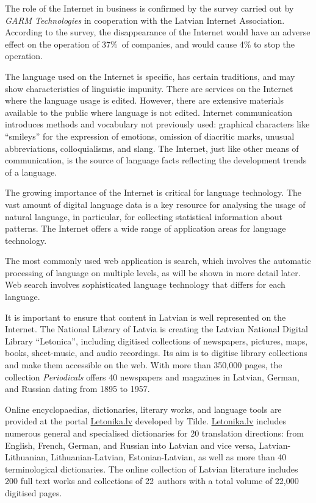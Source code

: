 \begin{multicols}{2}
The role of the Internet in business is confirmed by the survey carried out by \textit{GARM Technologies} in cooperation with the Latvian Internet Association.
According to the survey, the disappearance of the Internet would have an adverse effect on the operation of 37\%~of companies, and would cause 4\% to stop the operation.

The language used on the Internet is specific, has certain traditions, and may show characteristics of linguistic impunity.
There are services on the Internet where the language usage is edited.
However, there are extensive materials available to the public where language is not edited.
Internet communication introduces methods and vocabulary not previously used: graphical characters like ``smileys'' for the expression of emotions, omission of diacritic marks, unusual abbreviations, colloquialisms, and slang.
The Internet, just like other means of communication, is the source of language facts reflecting the development trends of a language.

The growing importance of the Internet is critical for language technology.
The vast amount of digital language data is a key resource for analysing the usage of natural language, in particular, for collecting statistical information about patterns.
The Internet offers a wide range of application areas for language technology.

The most commonly used web application is search, which involves the automatic processing of language on multiple levels, as will be shown in more detail later.
Web search involves sophisticated language technology that differs for each language.

It is important to ensure that content in Latvian is well represented on the Internet.
The National Library of Latvia is creating the Latvian National Digital Library ``Letonica'', including digitised collections of newspapers, pictures, maps, books, sheet-music, and audio recordings.
Its aim is to digitise library collections and make them accessible on the web.
With more than 350,000 pages, the collection \textit{Periodicals} \cite{Meta6} offers 40 newspapers and magazines in Latvian, German, and Russian dating from 1895 to 1957.

Online encyclopaedias, dictionaries, literary works, and language tools are provided at the portal \url{Letonika.lv} developed by Tilde.
\url{Letonika.lv} includes numerous general and specialised dictionaries for 20 translation directions: from English, French, German, and Russian into Latvian and vice versa, Latvian-Lithuanian, Lithuanian-Latvian, Estonian-Latvian, as well as more than 40 terminological dictionaries.
The online collection of Latvian literature includes 200 full text works and collections of 22~authors with a total volume of 22,000 digitised pages.


\end{multicols}
